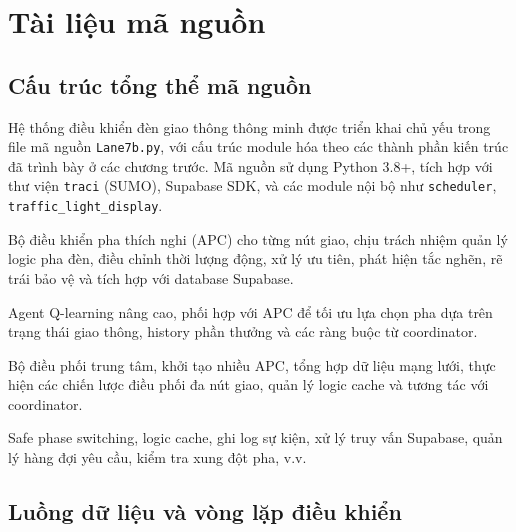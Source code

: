 \chapter{Tài liệu mã nguồn}

\section{Cấu trúc tổng thể mã nguồn}

Hệ thống điều khiển đèn giao thông thông minh được triển khai chủ yếu trong file mã nguồn \texttt{Lane7b.py}, với cấu trúc module hóa theo các thành phần kiến trúc đã trình bày ở các chương trước. Mã nguồn sử dụng Python 3.8+, tích hợp với thư viện \texttt{traci} (SUMO), Supabase SDK, và các module nội bộ như \texttt{scheduler}, \texttt{traffic\_light\_display}.

\begin{description}[leftmargin=2em,style=nextline]
    \item[\textbf{AdaptivePhaseController}] Bộ điều khiển pha thích nghi (APC) cho từng nút giao, chịu trách nhiệm quản lý logic pha đèn, điều chỉnh thời lượng động, xử lý ưu tiên, phát hiện tắc nghẽn, rẽ trái bảo vệ và tích hợp với database Supabase.
    \item[\textbf{EnhancedQLearningAgent}] Agent Q-learning nâng cao, phối hợp với APC để tối ưu lựa chọn pha dựa trên trạng thái giao thông, history phần thưởng và các ràng buộc từ coordinator.
    \item[\textbf{UniversalSmartTrafficController}] Bộ điều phối trung tâm, khởi tạo nhiều APC, tổng hợp dữ liệu mạng lưới, thực hiện các chiến lược điều phối đa nút giao, quản lý logic cache và tương tác với coordinator.
    \item[\textbf{Các hàm tiện ích}] Safe phase switching, logic cache, ghi log sự kiện, xử lý truy vấn Supabase, quản lý hàng đợi yêu cầu, kiểm tra xung đột pha, v.v.
\end{description}

\section{Luồng dữ liệu và vòng lặp điều khiển}

